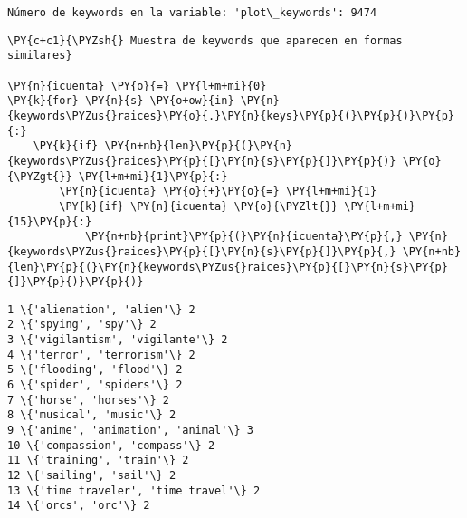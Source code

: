     \begin{Verbatim}[commandchars=\\\{\}]
Número de keywords en la variable: 'plot\_keywords': 9474
    \end{Verbatim}

    \begin{tcolorbox}[breakable, size=fbox, boxrule=1pt, pad at break*=1mm,colback=cellbackground, colframe=cellborder]
\begin{Verbatim}[commandchars=\\\{\}]
\PY{c+c1}{\PYZsh{} Muestra de keywords que aparecen en formas similares}

\PY{n}{icuenta} \PY{o}{=} \PY{l+m+mi}{0}
\PY{k}{for} \PY{n}{s} \PY{o+ow}{in} \PY{n}{keywords\PYZus{}raices}\PY{o}{.}\PY{n}{keys}\PY{p}{(}\PY{p}{)}\PY{p}{:}
    \PY{k}{if} \PY{n+nb}{len}\PY{p}{(}\PY{n}{keywords\PYZus{}raices}\PY{p}{[}\PY{n}{s}\PY{p}{]}\PY{p}{)} \PY{o}{\PYZgt{}} \PY{l+m+mi}{1}\PY{p}{:} 
        \PY{n}{icuenta} \PY{o}{+}\PY{o}{=} \PY{l+m+mi}{1}
        \PY{k}{if} \PY{n}{icuenta} \PY{o}{\PYZlt{}} \PY{l+m+mi}{15}\PY{p}{:}
            \PY{n+nb}{print}\PY{p}{(}\PY{n}{icuenta}\PY{p}{,} \PY{n}{keywords\PYZus{}raices}\PY{p}{[}\PY{n}{s}\PY{p}{]}\PY{p}{,} \PY{n+nb}{len}\PY{p}{(}\PY{n}{keywords\PYZus{}raices}\PY{p}{[}\PY{n}{s}\PY{p}{]}\PY{p}{)}\PY{p}{)}
\end{Verbatim}
\end{tcolorbox}

    \begin{Verbatim}[commandchars=\\\{\}]
1 \{'alienation', 'alien'\} 2
2 \{'spying', 'spy'\} 2
3 \{'vigilantism', 'vigilante'\} 2
4 \{'terror', 'terrorism'\} 2
5 \{'flooding', 'flood'\} 2
6 \{'spider', 'spiders'\} 2
7 \{'horse', 'horses'\} 2
8 \{'musical', 'music'\} 2
9 \{'anime', 'animation', 'animal'\} 3
10 \{'compassion', 'compass'\} 2
11 \{'training', 'train'\} 2
12 \{'sailing', 'sail'\} 2
13 \{'time traveler', 'time travel'\} 2
14 \{'orcs', 'orc'\} 2
    \end{Verbatim}

